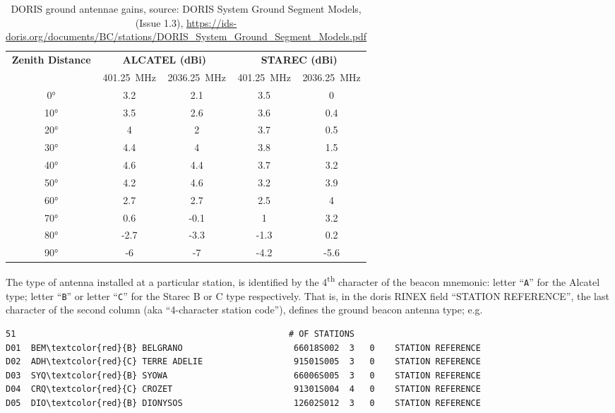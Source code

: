 \begin{table}[h!]
    \centering
    \begin{tabular}{|c | c | c | c | c|}
        \hline
        \textbf{Zenith Distance} & \multicolumn{2}{c}{\textbf{ALCATEL (dBi)}} & \multicolumn{2}{c|}{\textbf{STAREC (dBi)}} \\
                        & \SI{401.25}{\mega\hertz} & \SI{2036.25}{\mega\hertz} &  \SI{401.25}{\mega\hertz} & \SI{2036.25}{\mega\hertz}\\
        \hline
        \ang{0}&3.2&2.1&3.5&0 \\
        \ang{10}&3.5&2.6&3.6&0.4\\
        \ang{20}&4&2&3.7&0.5\\
        \ang{30}&4.4&4&3.8&1.5\\
        \ang{40}&4.6&4.4&3.7&3.2\\
        \ang{50}&4.2&4.6&3.2&3.9\\
        \ang{60}&2.7&2.7&2.5&4\\
        \ang{70}&0.6&-0.1&1&3.2\\
        \ang{80}&-2.7&-3.3&-1.3&0.2\\
        \ang{90}&-6&-7&-4.2&-5.6\\
        \hline
    \end{tabular}
    \caption{DORIS ground antennae gains, source: DORIS System Ground Segment Models, (Issue 1.3), \url{https://ids-doris.org/documents/BC/stations/DORIS_System_Ground_Segment_Models.pdf}}
    \label{table:antenna-gains}
\end{table}

The type of antenna installed at a particular station, is identified by the 
4\textsuperscript{th} character of the beacon mnemonic: letter ``\texttt{A}'' for the 
Alcatel type; letter ``\texttt{B}'' or letter ``\texttt{C}'' for the Starec B 
or C type respectively. That is, in the \gls{doris} RINEX field ``STATION REFERENCE'', 
the last character of the second column (aka ``4-character station code''), 
defines the ground beacon antenna type; e.g.

\begin{adjustbox}{max width=\linewidth , fbox=0.5pt}
\begin{BVerbatim}[commandchars=\\\{\}]
    51                                                      # OF STATIONS       
D01  BEM\textcolor{red}{B} BELGRANO                      66018S002  3   0    STATION REFERENCE   
D02  ADH\textcolor{red}{C} TERRE ADELIE                  91501S005  3   0    STATION REFERENCE   
D03  SYQ\textcolor{red}{B} SYOWA                         66006S005  3   0    STATION REFERENCE   
D04  CRQ\textcolor{red}{C} CROZET                        91301S004  4   0    STATION REFERENCE   
D05  DIO\textcolor{red}{B} DIONYSOS                      12602S012  3   0    STATION REFERENCE
\end{BVerbatim}
\end{adjustbox}

